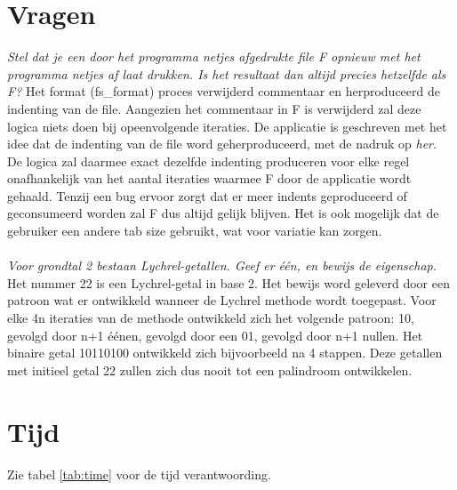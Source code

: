 \documentclass[10pt]{article}
\begin{document}
\section{Vragen}
\textit{Stel dat je een door het programma netjes afgedrukte file F opnieuw met het programma netjes af laat drukken.
      Is het resultaat dan altijd precies hetzelfde als F?}
\newline Het format (fs\_format) proces verwijderd commentaar en herproduceerd de indenting van de file.
Aangezien het commentaar in F is verwijderd zal deze logica niets doen bij opeenvolgende iteraties.
De applicatie is geschreven met het idee dat de indenting van de file word geherproduceerd,
met de nadruk op \textit{her}. De logica zal daarmee exact dezelfde indenting produceren voor elke
regel onafhankelijk van het aantal iteraties waarmee F door de applicatie wordt gehaald.
Tenzij een bug ervoor zorgt dat er meer indents geproduceerd of geconsumeerd worden zal
F dus altijd gelijk blijven. Het is ook mogelijk dat de gebruiker een andere tab size gebruikt,
wat voor variatie kan zorgen.
\\ \hfill \\
\textit{Voor grondtal 2 bestaan Lychrel-getallen. Geef er één, en bewijs de eigenschap.}
\newline
Het nummer 22 is een Lychrel-getal in base 2. Het bewijs word geleverd door een patroon wat er ontwikkeld wanneer de
Lychrel methode wordt toegepast. Voor elke 4n iteraties van de methode ontwikkeld zich het volgende patroon: 10,
gevolgd door n+1 éénen, gevolgd door een 01, gevolgd door n+1 nullen. Het binaire getal 10110100 ontwikkeld zich
bijvoorbeeld na 4 stappen. Deze getallen met initieel getal 22 zullen zich dus nooit tot een palindroom ontwikkelen.

\newpage
\section{Tijd}
Zie tabel \ref{tab:time} voor de tijd verantwoording.
\end{document}

